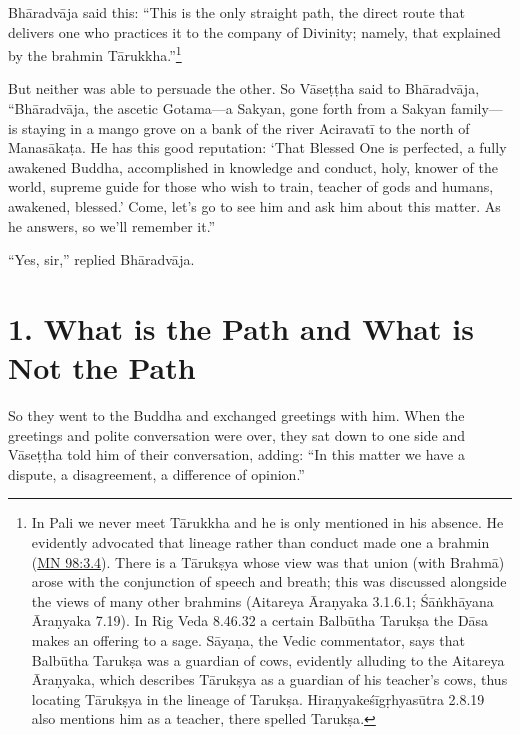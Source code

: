 \documentclass[12pt,openany]{book}%
\begin{document}
\textsanskrit{Bhāradvāja} said this: “This is the only straight path, the direct route that delivers one who practices it to the company of Divinity; namely, that explained by the brahmin \textsanskrit{Tārukkha}.”\footnote{In Pali we never meet \textsanskrit{Tārukkha} and he is only mentioned in his absence. He evidently advocated that lineage rather than conduct made one a brahmin (\href{https://suttacentral.net/mn98/en/sujato\#3.4}{MN 98:3.4}). There is a \textsanskrit{Tārukṣya} whose view was that union (with \textsanskrit{Brahmā}) arose with the conjunction of speech and breath; this was discussed alongside the views of many other brahmins (Aitareya \textsanskrit{Āraṇyaka} 3.1.6.1; \textsanskrit{Śāṅkhāyana} \textsanskrit{Āraṇyaka} 7.19). In Rig Veda 8.46.32 a certain \textsanskrit{Balbūtha} \textsanskrit{Tarukṣa} the \textsanskrit{Dāsa} makes an offering to a sage. \textsanskrit{Sāyaṇa}, the Vedic commentator, says that \textsanskrit{Balbūtha} \textsanskrit{Tarukṣa} was a guardian of cows, evidently alluding to the Aitareya \textsanskrit{Āraṇyaka}, which describes \textsanskrit{Tārukṣya} as a guardian of his teacher’s cows, thus locating \textsanskrit{Tārukṣya} in the lineage of \textsanskrit{Tarukṣa}. \textsanskrit{Hiraṇyakeśīgṛhyasūtra} 2.8.19 also mentions him as a teacher, there spelled \textsanskrit{Tarukṣa}. } 

But neither was able to persuade the other. So \textsanskrit{Vāseṭṭha} said to \textsanskrit{Bhāradvāja}, “\textsanskrit{Bhāradvāja}, the ascetic Gotama—a Sakyan, gone forth from a Sakyan family—is staying in a mango grove on a bank of the river \textsanskrit{Aciravatī} to the north of \textsanskrit{Manasākaṭa}. He has this good reputation: ‘That Blessed One is perfected, a fully awakened Buddha, accomplished in knowledge and conduct, holy, knower of the world, supreme guide for those who wish to train, teacher of gods and humans, awakened, blessed.’ Come, let’s go to see him and ask him about this matter. As he answers, so we’ll remember it.” 

“Yes, sir,” replied \textsanskrit{Bhāradvāja}. 

\section*{1. What is the Path and What is Not the Path }

So they went to the Buddha and exchanged greetings with him. When the greetings and polite conversation were over, they sat down to one side and \textsanskrit{Vāseṭṭha} told him of their conversation, adding: “In this matter we have a dispute, a disagreement, a difference of opinion.” 
\end{document}
